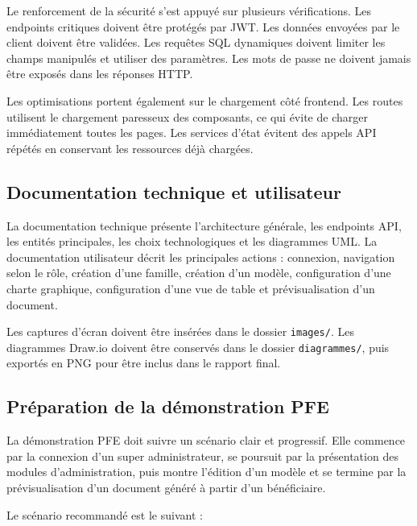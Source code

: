 Le renforcement de la sécurité s'est appuyé sur plusieurs vérifications. Les endpoints critiques doivent être protégés par JWT. Les données envoyées par le client doivent être validées. Les requêtes SQL dynamiques doivent limiter les champs manipulés et utiliser des paramètres. Les mots de passe ne doivent jamais être exposés dans les réponses HTTP.

Les optimisations portent également sur le chargement côté frontend. Les routes utilisent le chargement paresseux des composants, ce qui évite de charger immédiatement toutes les pages. Les services d'état évitent des appels API répétés en conservant les ressources déjà chargées.

\subsection{Documentation technique et utilisateur}

La documentation technique présente l'architecture générale, les endpoints API, les entités principales, les choix technologiques et les diagrammes UML. La documentation utilisateur décrit les principales actions : connexion, navigation selon le rôle, création d'une famille, création d'un modèle, configuration d'une charte graphique, configuration d'une vue de table et prévisualisation d'un document.

Les captures d'écran doivent être insérées dans le dossier \texttt{images/}. Les diagrammes Draw.io doivent être conservés dans le dossier \texttt{diagrammes/}, puis exportés en PNG pour être inclus dans le rapport final.

\subsection{Préparation de la démonstration PFE}

La démonstration PFE doit suivre un scénario clair et progressif. Elle commence par la connexion d'un super administrateur, se poursuit par la présentation des modules d'administration, puis montre l'édition d'un modèle et se termine par la prévisualisation d'un document généré à partir d'un bénéficiaire.

Le scénario recommandé est le suivant :

